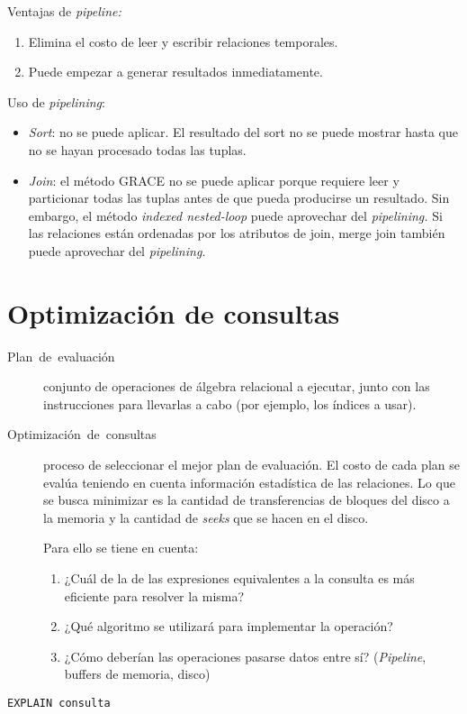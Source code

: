 \documentclass[a4paper, twoside]{article}
\begin{document}
Ventajas de \emph{pipeline:}
\begin{enumerate}
\item Elimina el costo de leer y escribir relaciones temporales.
\item Puede empezar a generar resultados inmediatamente.
\end{enumerate}
Uso de \emph{pipelining}:
\begin{itemize}
\item \emph{Sort}: no se puede aplicar. El resultado del sort no se puede
mostrar hasta que no se hayan procesado todas las tuplas.
\item \emph{Join}: el método GRACE no se puede aplicar porque requiere leer
y particionar todas las tuplas antes de que pueda producirse un resultado.
Sin embargo, el método \emph{indexed nested-loop} puede aprovechar
del \emph{pipelining. }Si las relaciones están ordenadas por los atributos
de join, merge join también puede aprovechar del \emph{pipelining.}
\end{itemize}

\section{Optimización de consultas}
\begin{description}
\item [{Plan~de~evaluación}] conjunto de operaciones de álgebra relacional
a ejecutar, junto con las instrucciones para llevarlas a cabo (por
ejemplo, los índices a usar).
\item [{Optimización~de~consultas}] proceso de seleccionar el mejor plan
de evaluación. El costo de cada plan se evalúa teniendo en cuenta
información estadística de las relaciones. Lo que se busca minimizar
es la cantidad de transferencias de bloques del disco a la memoria
y la cantidad de \emph{seeks} que se hacen en el disco. 


Para ello se tiene en cuenta:
\begin{enumerate}
\item ¿Cuál de la de las expresiones equivalentes a la consulta es más eficiente
para resolver la misma?
\item ¿Qué algoritmo se utilizará para implementar la operación?
\item ¿Cómo deberían las operaciones pasarse datos entre sí? (\emph{Pipeline},
buffers de memoria, disco)
\end{enumerate}
\end{description}
\begin{lstlisting}
EXPLAIN consulta
\end{lstlisting}
 
\end{document}
